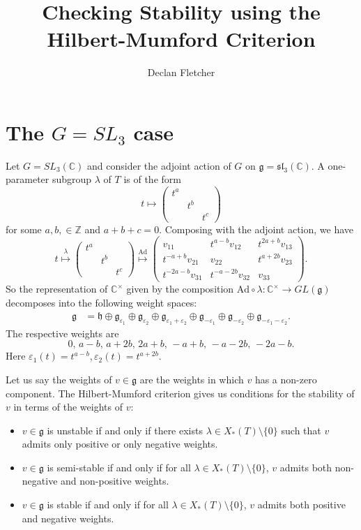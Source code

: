 \documentclass[12pt]{amsart}
\title{Checking Stability using the Hilbert-Mumford Criterion}
\author{Declan Fletcher}
\date{}
\newcommand{\C}{\mathbb{C}}
\newcommand{\g}{\mathfrak{g}}
\newcommand{\h}{\mathfrak{h}}
\theoremstyle{remark}
\theoremstyle{remark}
\theoremstyle{remark}
\begin{document}
\maketitle

\section*{The $G=SL_3$ case}

Let $G = SL_3(\C)$ and consider the adjoint action of $G$ on $\mathfrak{g} = \mathfrak{sl}_3(\C)$.
A one-parameter subgroup $\lambda$ of $T$ is of the form
$$t \mapsto \begin{pmatrix} t^a & & \\ & t^b & \\ & & t^c \end{pmatrix}$$
for some $a, b, \in \mathbb{Z}$ and $a + b + c = 0$.
Composing with the adjoint action, we have
$$t 
\overset{\lambda}{\mapsto} \begin{pmatrix} t^a & & \\ & t^b & \\ & & t^c \end{pmatrix}
 \overset{\mathrm{Ad}}{\mapsto} \begin{pmatrix} v_{11} & t^{a-b} v_{12} & t^{2a+b} v_{13} \\ t^{-a+b} v_{21} & v_{22} & t^{a+2b} v_{23} \\ t^{-2a-b} v_{31} & t^{-a-2b} v_{32} & v_{33} \end{pmatrix}.$$
So the representation of $\C^\times$ given by the composition $\mathrm{Ad} \circ \lambda: \C^\times \to GL(\mathfrak{g})$ decomposes into the following weight spaces:
\begin{align*}
	\g &= \h \oplus \g_{\varepsilon_1} \oplus \g_{\varepsilon_2} \oplus \g_{\varepsilon_1 + \varepsilon_2} \oplus \g_{-\varepsilon_1} \oplus \g_{-\varepsilon_2} \oplus \g_{-\varepsilon_1 - \varepsilon_2}. 
\end{align*}
The respective weights are
$$0, \, a-b, \, a+2b, \, 2a+b, \, -a+b, \, -a-2b, \,-2a-b.$$
Here $\varepsilon_1(t) = t^{a-b}, \varepsilon_2(t) = t^{a+2b}$.

Let us say the weights of $v \in \g$ are the weights in which $v$ has a non-zero component.
The Hilbert-Mumford criterion gives us conditions for the stability of $v$ in terms of the weights of $v$:
\begin{itemize}[label=-]
\item
$v \in \g$ is unstable if and only if there exists $\lambda \in X_*(T)\setminus\{0\}$ such that $v$ admits only positive or only negative weights.

\item
$v \in \g$ is semi-stable if and only if for all $\lambda \in X_*(T)\setminus\{0\}$, $v$ admits both non-negative and non-positive weights.

\item
$v \in \g$ is stable if and only if for all $\lambda \in X_*(T)\setminus\{0\}$, $v$ admits both positive and negative weights.
\end{itemize}
\end{document}
